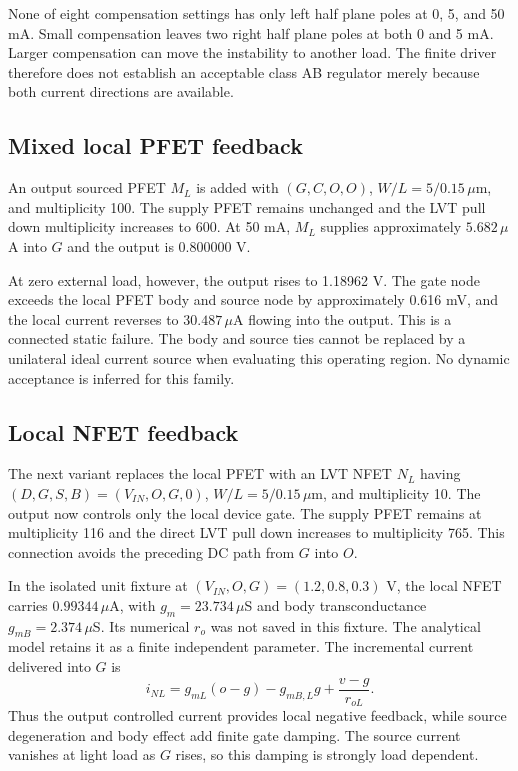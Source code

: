 None of eight compensation settings has only left half plane poles at 0, 5, and 50 mA. Small compensation leaves two right half plane poles at both 0 and 5 mA. Larger compensation can move the instability to another load. The finite driver therefore does not establish an acceptable class AB regulator merely because both current directions are available.

\subsection{Mixed local PFET feedback}
An output sourced PFET $M_L$ is added with $(G,C,O,O)$, $W/L=5/0.15\,\mu$m, and multiplicity 100. The supply PFET remains unchanged and the LVT pull down multiplicity increases to 600. At 50 mA, $M_L$ supplies approximately $5.682\,\mu$A into $G$ and the output is 0.800000 V.

At zero external load, however, the output rises to 1.18962 V. The gate node exceeds the local PFET body and source node by approximately 0.616 mV, and the local current reverses to $30.487\,\mu$A flowing into the output. This is a connected static failure. The body and source ties cannot be replaced by a unilateral ideal current source when evaluating this operating region. No dynamic acceptance is inferred for this family.

\subsection{Local NFET feedback}
The next variant replaces the local PFET with an LVT NFET $N_L$ having $(D,G,S,B)=(V_{IN},O,G,0)$, $W/L=5/0.15\,\mu$m, and multiplicity 10. The output now controls only the local device gate. The supply PFET remains at multiplicity 116 and the direct LVT pull down increases to multiplicity 765. This connection avoids the preceding DC path from $G$ into $O$.

In the isolated unit fixture at $(V_{IN},O,G)=(1.2,0.8,0.3)$ V, the local NFET carries $0.99344\,\mu$A, with $g_m=23.734\,\mu$S and body transconductance $g_{mB}=2.374\,\mu$S. Its numerical $r_o$ was not saved in this fixture. The analytical model retains it as a finite independent parameter. The incremental current delivered into $G$ is
\begin{equation}
 i_{NL}=g_{mL}(o-g)-g_{mB,L}g+\frac{v-g}{r_{oL}}.
\end{equation}
Thus the output controlled current provides local negative feedback, while source degeneration and body effect add finite gate damping. The source current vanishes at light load as $G$ rises, so this damping is strongly load dependent.

